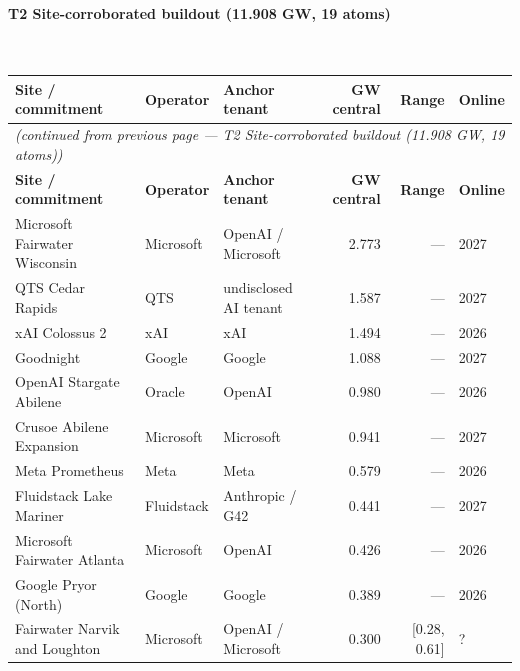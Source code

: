 \documentclass[11pt,a4paper]{article}
\begin{document}
\paragraph{\textbf{T2 Site-corroborated buildout (11.908 GW, 19 atoms)}}~\\[0.3em]
\noindent\begin{small}
\begin{longtable}{@{}p{4.5cm} p{2.4cm} p{2.4cm} r r p{1.8cm}@{}}
\toprule
\textbf{Site / commitment} & \textbf{Operator} & \textbf{Anchor tenant} & \textbf{GW central} & \textbf{Range} & \textbf{Online} \\
\midrule
\endfirsthead
\multicolumn{6}{l}{\textit{(continued from previous page — T2 Site-corroborated buildout (11.908 GW, 19 atoms))}} \\
\toprule
\textbf{Site / commitment} & \textbf{Operator} & \textbf{Anchor tenant} & \textbf{GW central} & \textbf{Range} & \textbf{Online} \\
\midrule
\endhead
\bottomrule
\endfoot

Microsoft Fairwater Wisconsin & Microsoft & OpenAI / Microsoft & 2.773 & — & 2027 \\

QTS Cedar Rapids & QTS & undisclosed AI tenant & 1.587 & — & 2027 \\

xAI Colossus 2 & xAI & xAI & 1.494 & — & 2026 \\

Goodnight & Google & Google & 1.088 & — & 2027 \\

OpenAI Stargate Abilene & Oracle & OpenAI & 0.980 & — & 2026 \\

Crusoe Abilene Expansion & Microsoft & Microsoft & 0.941 & — & 2027 \\

Meta Prometheus & Meta & Meta & 0.579 & — & 2026 \\

Fluidstack Lake Mariner & Fluidstack & Anthropic / G42 & 0.441 & — & 2027 \\

Microsoft Fairwater Atlanta & Microsoft & OpenAI & 0.426 & — & 2026 \\

Google Pryor (North) & Google & Google & 0.389 & — & 2026 \\

Fairwater Narvik and Loughton & Microsoft & OpenAI / Microsoft & 0.300 & [0.28, 0.61] & ? \\


\end{longtable}
\end{small}
\end{document}

